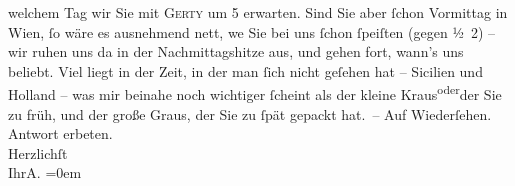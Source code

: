 \begin{ledgroupsized}[t]{13cm}
               welchem Tag wir Sie mit \textsc{Gerty} um 5 erwarten. Sind Sie aber {\pb}ſchon
                  Vormittag in Wien, ſo wäre es
               ausnehmend nett, we{\geminationn}{ }Sie bei uns ſchon ſpeiſten (gegen ½ 2)
               – wir ruhen uns da{\geminationn} in der Nachmittagshitze aus, und
               gehen fort, wann’s uns beliebt. Viel liegt in der Zeit, in der man ſich nicht geſehen
               hat – Sicilien und Holland – was mir beinahe noch wichtiger ſcheint als der kleine Kraus\substVorne{}\textsuperscript{oder}\substDazwischen{}der Sie zu früh, und\substHinten{} der große Graus, der Sie zu ſpät gepackt hat. –\pend
           \pstart
           Auf Wiederſehen. Antwort erbeten.{\\[\baselineskip]}Herzlichſt{\\[\baselineskip]}Ihr\spacefill\mbox{A.}\pend
           \leftskip=0em{}
         
         \endnumbering{}\end{ledgroupsized}  \newcommand{\dateiname}{L01407}\newcommand{\titel}{Arthur Schnitzler an Hugo von Hofmannsthal, [19.? 6. 1904]}\newcommand{\editorInnen}{Martin Anton Müller und Gerd-Hermann Susen}
      